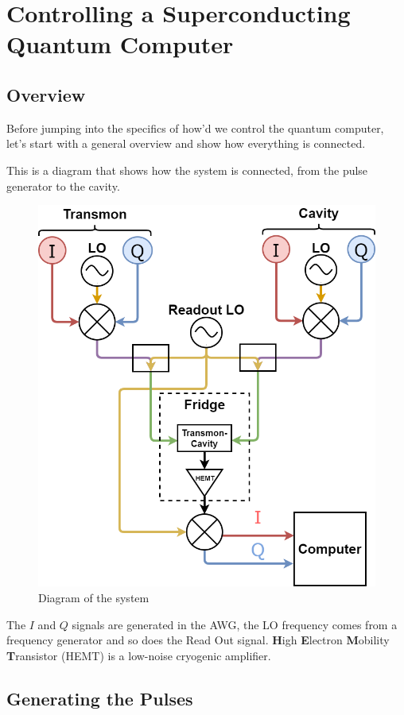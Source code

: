 \section{Controlling a Superconducting Quantum Computer} \label{chap:FPGA}
\subsection{Overview}
Before jumping into the specifics of how'd we control the quantum computer, let's start with a general overview and show how everything is connected.

This is a diagram that shows how the system is connected, from the pulse generator to the cavity.

\begin{figure}[H]
    \centering
    \includegraphics[width=0.85\columnwidth]{overview.png}
    \caption{Diagram of the system}
    \label{fig:System-diagram}
\end{figure}

The $I$ and $Q$ signals are generated in the AWG, the LO frequency comes from a frequency generator and so does the Read Out signal. \textbf{H}igh \textbf{E}lectron \textbf{M}obility \textbf{T}ransistor (HEMT) is a low-noise cryogenic amplifier.

\subsection{Generating the Pulses}
